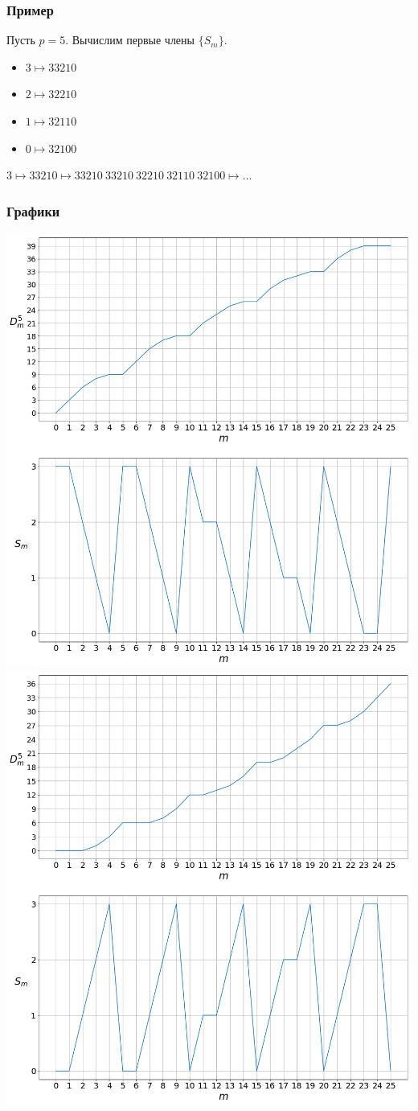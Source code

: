 \begin{frame}
\frametitle{Пример}
Пусть $p=5$. Вычислим первые члены $\{S_m\}$.\bigskip\\

\begin{itemize}
\item $3 \mapsto 33210$
\item $2 \mapsto 32210$
\item $1 \mapsto 32110$
\item $0 \mapsto 32100$
\end{itemize}

$3 \mapsto 33210 \mapsto 33210\ 33210\ 32210\ 32110\ 32100 \mapsto \ldots$
\end{frame}

\begin{frame}
\frametitle{Графики}
\includegraphics[width=0.5\linewidth]{degrees_big}
\includegraphics[width=0.5\linewidth]{degrees_small}
\end{frame}

